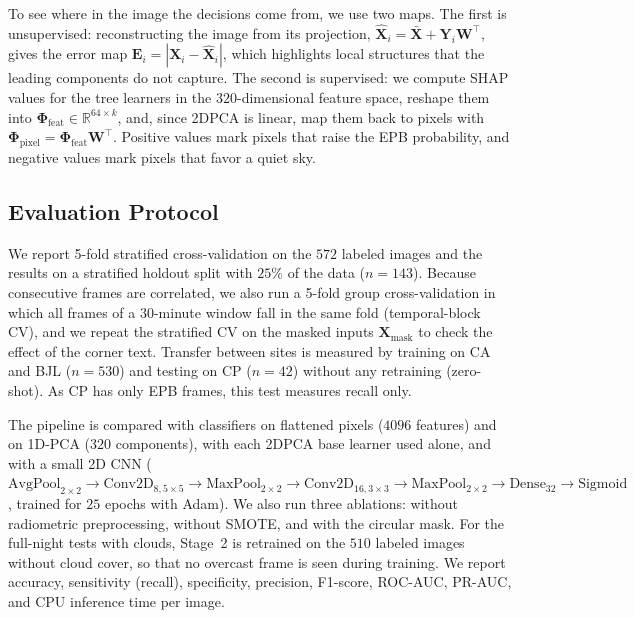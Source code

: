 To see where in the image the decisions come from, we use two maps. The first is unsupervised: reconstructing the image from its projection, $\hat{\mathbf{X}}_i = \bar{\mathbf{X}} + \mathbf{Y}_i \mathbf{W}^\top$, gives the error map $\mathbf{E}_i = |\mathbf{X}_i - \hat{\mathbf{X}}_i|$, which highlights local structures that the leading components do not capture. The second is supervised: we compute SHAP values \cite{lundberg2017unified} for the tree learners in the $320$-dimensional feature space, reshape them into $\boldsymbol{\Phi}_{\text{feat}} \in \mathbb{R}^{64 \times k}$, and, since 2DPCA is linear, map them back to pixels with $\boldsymbol{\Phi}_{\text{pixel}} = \boldsymbol{\Phi}_{\text{feat}}\mathbf{W}^\top$. Positive values mark pixels that raise the EPB probability, and negative values mark pixels that favor a quiet sky.

\subsection{Evaluation Protocol}\label{sec:protocol}

We report 5-fold stratified cross-validation on the $572$ labeled images and the results on a stratified holdout split with $25\%$ of the data ($n=143$). Because consecutive frames are correlated, we also run a 5-fold group cross-validation in which all frames of a $30$-minute window fall in the same fold (temporal-block CV), and we repeat the stratified CV on the masked inputs $\mathbf{X}_{\text{mask}}$ to check the effect of the corner text. Transfer between sites is measured by training on CA and BJL ($n=530$) and testing on CP ($n=42$) without any retraining (zero-shot). As CP has only EPB frames, this test measures recall only.

The pipeline is compared with classifiers on flattened pixels ($4096$ features) and on 1D-PCA ($320$ components), with each 2DPCA base learner used alone, and with a small 2D CNN ($\text{AvgPool}_{2\times 2} \to \text{Conv2D}_{8,5\times 5} \to \text{MaxPool}_{2\times 2} \to \text{Conv2D}_{16,3\times 3} \to \text{MaxPool}_{2\times 2} \to \text{Dense}_{32} \to \text{Sigmoid}$, trained for $25$ epochs with Adam). We also run three ablations: without radiometric preprocessing, without SMOTE, and with the circular mask. For the full-night tests with clouds, Stage~2 is retrained on the $510$ labeled images without cloud cover, so that no overcast frame is seen during training. We report accuracy, sensitivity (recall), specificity, precision, F1-score, ROC-AUC, PR-AUC, and CPU inference time per image.
